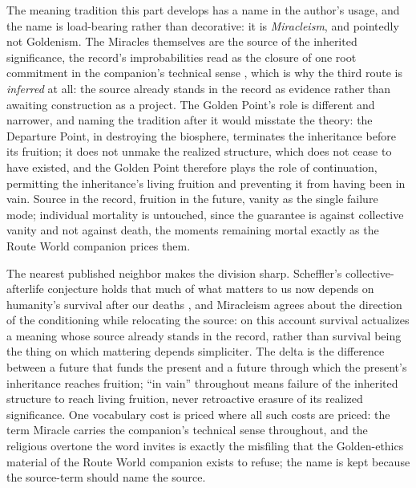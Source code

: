 \begin{remark}
\label{rem:naming}
The meaning tradition this part develops has a name in the author's
usage, and the name is load-bearing rather than decorative: it is
\emph{Miracleism}, and pointedly not Goldenism. The Miracles
themselves are the source of the inherited significance, the record's
improbabilities read as the closure of one root commitment in the
companion's technical sense \cite{Nexus}, which is why the third
route is \emph{inferred} at all: the source already stands in the
record as evidence rather than awaiting construction as a project.
The Golden Point's role is different and narrower, and naming the
tradition after it would misstate the theory: the Departure Point,
in destroying the biosphere, terminates the inheritance before its
fruition; it does not unmake the realized structure, which does not
cease to have existed, and the Golden Point therefore plays the role
of continuation, permitting the inheritance's living fruition and
preventing it from having been in vain. Source in the record,
fruition in the future, vanity as the single failure
mode; individual mortality is untouched, since the guarantee is
against collective vanity and not against death, the moments
remaining mortal exactly as the Route World companion \cite{GoldenRouteWorld} prices them.

The nearest published neighbor makes the division sharp. Scheffler's
collective-afterlife conjecture holds that much of what matters to
us now depends on humanity's survival after our deaths
\cite{Scheffler13}, and Miracleism agrees about the direction of the
conditioning while relocating the source: on this account survival
actualizes a meaning whose source already stands in the record,
rather than survival being the thing on which mattering depends
simpliciter. The delta is the difference between a future that
funds the present and a future through which the present's inheritance
reaches fruition; ``in vain'' throughout means failure of the inherited
structure to reach living fruition, never retroactive erasure of its
realized significance. One vocabulary cost is priced where all such costs are
priced: the term Miracle carries the companion's technical sense
throughout, and the religious overtone the word invites is exactly
the misfiling that the Golden-ethics material of the Route World companion \cite{GoldenRouteWorld} exists to refuse; the
name is kept because the source-term should name the source.
\end{remark}

